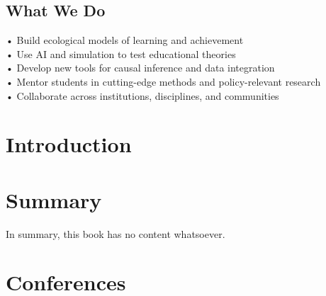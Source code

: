 \documentclass[
  letterpaper,
  DIV=11,
  numbers=noendperiod]{scrreprt}
\begin{document}
\section*{What We Do}\label{what-we-do}


• Build ecological models of learning and achievement\\
• Use AI and simulation to test educational theories\\
• Develop new tools for causal inference and data integration\\
• Mentor students in cutting-edge methods and policy-relevant research\\
• Collaborate across institutions, disciplines, and communities


\chapter{Introduction}\label{introduction}


\chapter{Summary}\label{summary}

In summary, this book has no content whatsoever.


\chapter{Conferences}\label{conferences}
\end{document}
